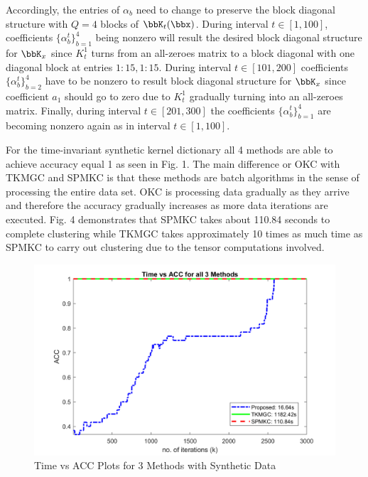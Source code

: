 \documentclass[10pt,final]{IEEEtran}
\begin{document}
 Accordingly, the entries of $\alpha_b$ need to change to preserve the block diagonal structure with $Q=4$ blocks of $\bbK_t(\bbx)$. During interval $t\in[1,100]$,  coefficients $\{\alpha_b^t\}_{b=1}^4$ being nonzero will result the desired block diagonal structure for $\bbK_x$ since $K^1_t$ turns from an all-zeroes matrix to a block diagonal with one diagonal block at entries $1:15,1:15$. During interval $t\in[101,200]$ coefficients $\{\alpha_b^t\}_{b=2}^4$ have to be nonzero to result block diagonal structure for $\bbK_x$ since coefficient $a_1$ should go  to zero due to $K^1_t$ gradually turning into an all-zeroes matrix. Finally, during interval  $t\in[201,300]$  the  coefficients 
 $\{\alpha_b^t\}_{b=1}^4$ are becoming nonzero again as in interval $t\in[1,100]$.
 
For the time-invariant synthetic kernel dictionary all 4 methods are able to achieve accuracy equal 1 as seen in Fig. 1. The main difference or OKC with TKMGC and SPMKC is that these methods are batch algorithms in the sense of processing the entire data set. OKC is processing data gradually as they arrive and therefore the accuracy gradually increases as more data iterations are executed. Fig. 4 demonstrates that  SPMKC takes about 110.84 seconds to complete clustering while TKMGC takes approximately 10 times as much time as SPMKC to carry out clustering  due to the tensor computations involved.
\begin{figure}[htp]
    \centering
    \includegraphics[scale=0.2]{acc_synthetic_plots.png}
    \caption{Time vs ACC Plots for 3 Methods with Synthetic Data}
    \label{Fig:1s}
\end{figure}
\end{document}
